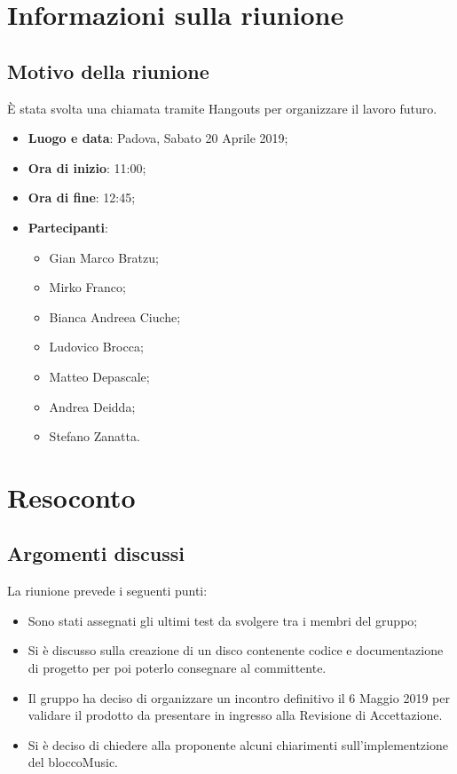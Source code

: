 \documentclass[a4paper,12pt]{article}
\begin{document}
	\tableofcontents
	\cleardoublepage
	\section{Informazioni sulla riunione}
	\subsection{Motivo della riunione} \`{E} stata svolta una chiamata tramite Hangouts per organizzare il lavoro futuro.
	\begin{itemize}
		\item \textbf{Luogo e data}: Padova, Sabato 20 Aprile 2019;
		\item \textbf{Ora di inizio}: 11:00;
		\item \textbf{Ora di fine}: 12:45;
		\item \textbf{Partecipanti}:  
		\begin{itemize}
			\item Gian Marco Bratzu;
			\item Mirko Franco;
			\item Bianca Andreea Ciuche;
			\item Ludovico Brocca;
			\item Matteo Depascale;
			\item Andrea Deidda;
			\item Stefano Zanatta.
		\end{itemize}
	\end{itemize}
	
	
		\section{Resoconto}
	\subsection{Argomenti discussi}
	La riunione prevede i seguenti punti:
	\begin{itemize}		
		\item Sono stati assegnati gli ultimi test da svolgere tra i membri del gruppo;
		\item Si è discusso sulla creazione di un disco contenente codice e documentazione di progetto per poi poterlo consegnare al committente.
      	\item Il gruppo ha deciso di organizzare un incontro definitivo il 6 Maggio 2019 per validare il prodotto da presentare in ingresso alla Revisione di Accettazione.
      	\item Si è deciso di chiedere alla proponente  alcuni chiarimenti sull'implementzione del bloccoMusic.
	\end{itemize}
	
\end{document}
